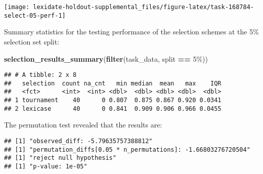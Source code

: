 \documentclass[
]{book}
\newenvironment{Shaded}{\begin{snugshade}}{\end{snugshade}}
\newcommand{\AttributeTok}[1]{\textcolor[rgb]{0.13,0.29,0.53}{#1}}
\newcommand{\DecValTok}[1]{\textcolor[rgb]{0.00,0.00,0.81}{#1}}
\newcommand{\FunctionTok}[1]{\textcolor[rgb]{0.13,0.29,0.53}{\textbf{#1}}}
\newcommand{\NormalTok}[1]{#1}
\newcommand{\OtherTok}[1]{\textcolor[rgb]{0.56,0.35,0.01}{#1}}
\newcommand{\SpecialCharTok}[1]{\textcolor[rgb]{0.81,0.36,0.00}{\textbf{#1}}}
\newcommand{\StringTok}[1]{\textcolor[rgb]{0.31,0.60,0.02}{#1}}
\begin{document}
\texttt{[image: lexidate-holdout-supplemental\_files/figure-latex/task-168784-select-05-perf-1]}

Summary statistics for the testing performance of the selection schemes at the 5\% selection set split:

\begin{Shaded}
\begin{Highlighting}[]
\FunctionTok{selection\_results\_summary}\NormalTok{(}\FunctionTok{filter}\NormalTok{(task\_data, split }\SpecialCharTok{==} \StringTok{\textquotesingle{}5\%\textquotesingle{}}\NormalTok{))}
\end{Highlighting}
\end{Shaded}

\begin{verbatim}
## # A tibble: 2 x 8
##   selection  count na_cnt   min median  mean   max    IQR
##   <fct>      <int>  <int> <dbl>  <dbl> <dbl> <dbl>  <dbl>
## 1 tournament    40      0 0.807  0.875 0.867 0.920 0.0341
## 2 lexicase      40      0 0.841  0.909 0.906 0.966 0.0455
\end{verbatim}

The permutation test revealed that the results are:

\begin{Shaded}
\end{Shaded}

\begin{verbatim}
## [1] "observed_diff: -5.79635757388812"
## [1] "permutation_diffs[0.05 * n_permutations]: -1.66803276720504"
## [1] "reject null hypothesis"
## [1] "p-value: 1e-05"
\end{verbatim}
\end{document}
